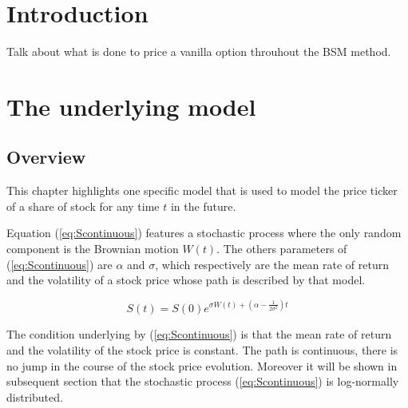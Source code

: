 \documentclass[12pt]{report}
\newcommand{\Bm}{W\left(t\right)}
\newcommand{\St}{S\left(t\right)}
\newcommand{\Si}{S\left(0\right)}
\newcommand{\Scontinuous}{\St = \Si e^{\sigma\Bm + \left(\alpha - \frac{1}{2 \sigma^2}\right)t}}
\begin{document}

\tableofcontents{}



%
%
\chapter*{Introduction}
\label{cha:Introduction}
Talk about what is done to price a vanilla option throuhout the BSM method.
%
%
\chapter{The underlying model}
\label{cha:underlying}
  


\section{Overview}
\label{sec:Overview}

This chapter highlights one specific model that is used to model the price ticker of a share of stock for any time $t$ in the future.

Equation (\ref{eq:Scontinuous}) features a stochastic process where the only random component is the Brownian motion $\Bm$.
The others parameters of (\ref{eq:Scontinuous}) are $\alpha$ and $\sigma$, which respectively are the mean rate of return and the volatility of a stock price whose path is described by that model.

\begin{center}
  \begin{equation}
    \Scontinuous
    \label{eq:Scontinuous}
  \end{equation}
\end{center}

 The condition underlying by (\ref{eq:Scontinuous}) is that the mean rate of return and the volatility of the stock price is constant. The path is continuous, there is no jump in the course of the stock price evolution. Moreover it will be shown in subsequent section that the stochastic process (\ref{eq:Scontinuous}) is log-normally distributed.
\end{document}
